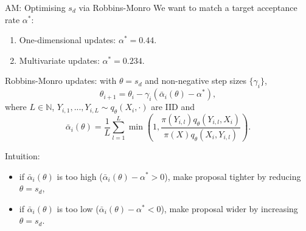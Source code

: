 \documentclass[aspectratio=169]{beamer}
\begin{document}
\begin{frame}{AM: Optimising $s_d$ via Robbins-Monro}
    We want to match a target acceptance rate $\alpha^*$:
    \begin{enumerate}
        \item One-dimensional updates: $\alpha^* = 0.44$.

        \item Multivariate updates: $\alpha^* = 0.234$.
    \end{enumerate}
    \pause

    Robbins-Monro updates: with $\theta = s_d$ and non-negative step sizes $\{\gamma_i\}$,
    $$\theta_{i+1} = \theta_i - \gamma_i (\bar{\alpha}_i(\theta) - \alpha^*),$$
    \pause
    where $L \in \mathbb{N}$, $Y_{i,1}, ..., Y_{i,L} \sim q_\theta(X_i, \cdot)$ are IID and
    $$\bar{\alpha}_i(\theta) = \frac{1}{L}\sum_{l=1}^L \min \left(1, \frac{\pi(Y_{i,l}) q_\theta(Y_{i,l}, X_i)}{\pi(X) q_\theta(X_i, Y_{i,l})} \right).$$

    \pause
    Intuition: 
    \begin{itemize}
        \item if $\bar{\alpha}_i(\theta)$ is too high ($\bar{\alpha}_i(\theta) - \alpha^* > 0$), make proposal tighter by reducing $\theta = s_d$,
        \item if $\bar{\alpha}_i(\theta)$ is too low ($\bar{\alpha}_i(\theta) - \alpha^* < 0$), make proposal wider by increasing $\theta = s_d$.
    \end{itemize}
\end{frame}
\end{document}
